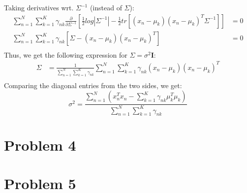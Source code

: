 \documentclass{article}
\begin{document}
Taking derivatives wrt. $\Sigma^{-1}$ (instead of $\Sigma$):
\begin{equation*}
\begin{aligned}
\sum_{n=1}^N\sum_{k=1}^K \gamma_{nk}\frac{\partial}{\partial \Sigma^{-1}}[ \frac{1}{2}log|\Sigma^{-1}| - \frac{1}{2}tr[(x_n- \mu_k)(x_n-\mu_k)^T\Sigma^{-1}]] &= 0\\
\sum_{n=1}^N\sum_{k=1}^K \gamma_{nk} [\Sigma - (x_n- \mu_k)(x_n-\mu_k)^T ] &=0 \\
\end{aligned}
\end{equation*}
Thus, we get the following expression for $\Sigma = \sigma^2\textbf{I}$:
\begin{equation*}
\begin{aligned}
\Sigma &= \frac{1}{\sum_{n=1}^N\sum_{k=1}^K \gamma_{nk}} \sum_{n=1}^N\sum_{k=1}^K \gamma_{nk}(x_n- \mu_k)(x_n-\mu_k)^T \\
\end{aligned}
\end{equation*}
Comparing the diagonal entries from the two sides, we get:
$$\sigma^2 = \frac{\sum_{n=1}^N (x_n^Tx_n - \sum_{k=1}^K \gamma_{nk}\mu_k^T\mu_k)}{\sum_{n=1}^N\sum_{k=1}^K \gamma_{nk}}$$
\section{Problem 4}
\section{Problem 5}
\end{document}
